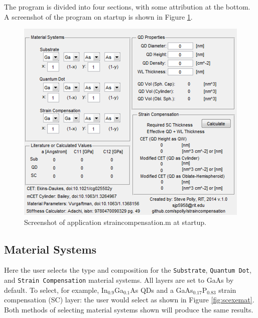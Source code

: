 \documentclass{article}
\begin{document}
The program is divided into four sections, with some attribution at the bottom. A screenshot of the program on startup is shown in Figure \ref{fig:scexe}.

\begin{figure}
	\includegraphics[width=0.85\linewidth]{scexe}
	\centering
	\caption{Screenshot of application straincompensation.m at startup.}
	\label{fig:scexe}
\end{figure}

\subsection{Material Systems}
Here the user selects the type and composition for the \texttt{Substrate}, \texttt{Quantum Dot}, and \texttt{Strain Compensation} material systems. All layers are set to GaAs by default. To select, for example, In$_{0.9}$Ga$_{0.1}$As QDs and a GaAs$_{0.17}$P$_{0.83}$ strain compensation (SC) layer: the user would select as shown in Figure \ref{fig:scexemat}. Both methods of selecting material systems shown will produce the same results.
\end{document}
